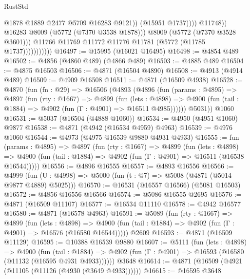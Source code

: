 \begin{lexlean}{RustStd}
\begin{coremodule}
{\begin{coremodule}
{{{{{{{{{{{{{{{{{{{{{{{{{{{{{                                        @1878
                                        @1889
                                        @2477
                                        @5709
                                        @16283
                                        @9121))
                                    (@15951 @1737))))
                              @11748))
                          @16283
                          @8009
                          (@5772 (@7370 @3538 @1878)))
                        @8009
                        (@5772 (@7370 @3528 @3601)))
                      @11766
                      @11769
                      @11772
                      @11776
                      @11781
                      (@5772 (@11785 @1737)))))))))))
@16497 := @15995 (@16021 @16495)
@16498 := @4854 @489
@16502 := @4856 (@4860 @489) (@4866 @489)
@16503 := @4885 @489
@16504 := @4875 @16503
@16506 := @4871 (@16504 @4890)
@16508 := @4913 (@4914 @489)
@16509 := @4909 @16508
@16511 := @4871 (@16509 @4938)
@16528 := @4870
    (fun (fn : @29) =>
    @16506
      (@4893
        (@4896
          (fun (params : @4895) =>
          @4897
            (fun (rty : @1667) =>
            @4899
              (fun (lets : @4898) =>
              @4900 (fun (tail : @1884) => @4902 (fun (Γ : @4901) => @16511 @4985))))))
        @5031))
    @1060
@16531 := @5037 (@16504 (@4888 @1060))
@16534 := @4950 (@4951 @1060) @9877
@16538 := @4871 (@4942 (@16534 @4959) @4963)
@16539 := @4976 @1060
@16544 := @4973 (@4975 @16539 @9880 @4931 @4933)
@16555 := fun (params : @4895) =>
  @4897
    (fun (rty : @1667) =>
    @4899
      (fun (lets : @4898) =>
      @4900 (fun (tail : @1884) => @4902 (fun (Γ : @4901) => @16511 (@16538 @16544)))))
@16556 := @4896 @16555
@16557 := @4893 @16556
@16566 := @4999 (fun (U : @4998) => @5000 (fun (t : @7) => @5008 (@4871 (@5014 @9877 @4889) @5025)))
@16570 := @16531 (@16557 @16566) (@5081 @16503)
@16572 := @4856 @16556 @16566
@16574 := @5086 @16555 @2695
@16576 := @4871 (@16509 @11107)
@16577 := @16534 @11110
@16578 := @4942 @16577
@16580 := @4871 (@16578 @4963)
@16591 := @5089
    (fun (rty : @1667) =>
    @4899
      (fun (lets : @4898) =>
      @4900 (fun (tail : @1884) => @4902 (fun (Γ : @4901) => @16576 (@16580 @16544)))))
    @2609
@16593 := @4871 (@16509 @11129)
@16595 := @10388 @16539 @9880
@16607 := @5111
    (fun (lets : @4898) =>
    @4900
      (fun (tail : @1884) =>
      @4902 (fun (Γ : @4901) => @16593 (@16580 (@11132 (@16595 @4931 @4933))))))
    @3648
@16614 := @4871 (@16509 (@4921 (@11105 (@11126 (@4930 (@3649 @4933))))))
@16615 := @16595 @3648
}}}}}}}}}}}}}}}}}}}}}}}}}}}}}
\end{coremodule}}
\end{coremodule}
\end{lexlean}

